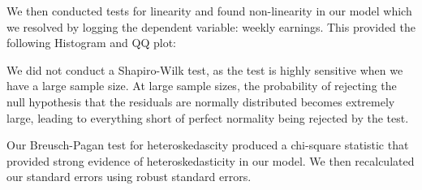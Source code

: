\documentclass[11pt]{article} %
\begin{document}
We then conducted tests for linearity and found non-linearity in our model which we resolved by logging the dependent variable: weekly earnings. This provided the following Histogram and QQ plot:

\begin{figure} [h]
    \centering
    \qquad
    \label{fig:example}%
\end{figure}

We did not conduct a Shapiro-Wilk test, as the test is highly sensitive when we have a large sample size. At large sample sizes, the probability of rejecting the null hypothesis that the residuals are normally distributed becomes extremely large, leading to everything short of perfect normality being rejected by the test. 

Our Breusch-Pagan test for heteroskedascity produced a chi-square statistic that provided strong evidence of heteroskedasticity in our model. We then recalculated our standard errors using robust standard errors.
\end{document}

